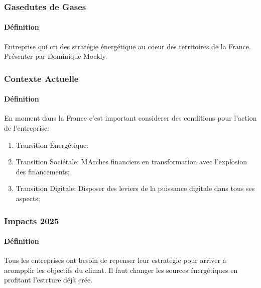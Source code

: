 \documentclass{article}
\begin{document}
\subsubsection{Gasedutes de Gases}
\paragraph{Définition}Entreprise qui cri des stratégie énergétique au coeur des territoires de la France. Présenter par Dominique Mockly.

\subsubsection{Contexte Actuelle}
\paragraph{Définition}En moment dans la France c'est important considerer des conditions pour l'action de l'entreprise:
\begin{enumerate}[noitemsep]
    \item Transition Énergétique:  
    \item Transition Sociétale: MArches financiers en transformation avec l'explosion des financements;
    \item Transition Digitale: Disposer des leviers de la puissance digitale dans tous ses aspects;
\end{enumerate}

\subsubsection{Impacts 2025}
\paragraph{Définition}Tous les entreprises ont besoin de repenser leur estrategie pour arriver a acompplir les objectifs du climat. Il faut changer les sources énergétiques en profitant l'estrture déjà crée.
\end{document}
